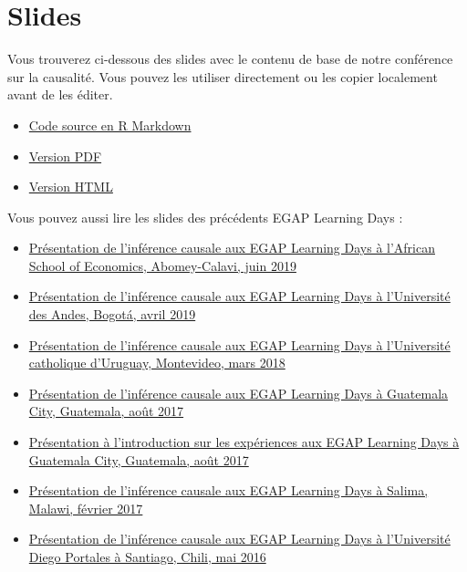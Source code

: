\documentclass[
  12pt,
]{book}
\begin{document}
\hypertarget{slides-1}{%
\section{Slides}\label{slides-1}}

Vous trouverez ci-dessous des slides avec le contenu de base de notre conférence sur la causalité. Vous pouvez les utiliser directement ou les copier localement avant de les éditer.

\begin{itemize}
\item
  \href{https://egap.github.io/learningdays-resources/Slides/causalinference-slides.Rmd}{Code source en R Markdown}
\item
  \href{https://egap.github.io/learningdays-resources/Slides/causalinference-slides.pdf}{Version PDF}
\item
  \href{https://egap.github.io/learningdays-resources/Slides/causalinference-slides.html}{Version HTML}
\end{itemize}

Vous pouvez aussi lire les slides des précédents EGAP Learning Days :

\begin{itemize}
\item
  \href{https://egap.github.io/learningdays-resources/Slides/Examples/causality-benin.pdf}{Présentation de l'inférence causale aux EGAP Learning Days à l'African School of Economics, Abomey-Calavi, juin 2019}
\item
  \href{https://egap.github.io/learningdays-resources/Slides/Examples/causality-bogota.pdf}{Présentation de l'inférence causale aux EGAP Learning Days à l'Université des Andes, Bogotá, avril 2019}
\item
  \href{https://egap.github.io/learningdays-resources/Slides/Examples/causality-montevideo.pdf}{Présentation de l'inférence causale aux EGAP Learning Days à l'Université catholique d'Uruguay, Montevideo, mars 2018}
\item
  \href{https://egap.github.io/learningdays-resources/Slides/Examples/causality-guatemala.pdf}{Présentation de l'inférence causale aux EGAP Learning Days à Guatemala City, Guatemala, août 2017}
\item
  \href{https://egap.github.io/learningdays-resources/Slides/Examples/intro_experiments-guatemala.pdf}{Présentation à l'introduction sur les expériences aux EGAP Learning Days à Guatemala City, Guatemala, août 2017}
\item
  \href{https://egap.github.io/learningdays-resources/Slides/Examples/causality-malawi.pdf}{Présentation de l'inférence causale aux EGAP Learning Days à Salima, Malawi, février 2017}
\item
  \href{https://egap.github.io/learningdays-resources/Slides/Examples/causality-santiago.pdf}{Présentation de l'inférence causale aux EGAP Learning Days à l'Université Diego Portales à Santiago, Chili, mai 2016}
\end{itemize}
\end{document}
